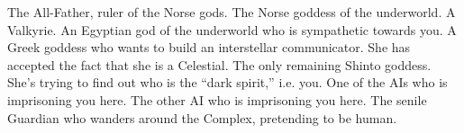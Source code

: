\documentclass[char]{guardians}
\begin{document}
\begin{contacts}
  \contact{\cOdin{}} The All-Father, ruler of the Norse gods.
  \contact{\cHel{}} The Norse goddess of the underworld.
  \contact{\cVal{}} A Valkyrie.
  \contact{\cAnubis{}} An Egyptian god of the underworld who is sympathetic towards you.
  \contact{\cAthena{}} A Greek goddess who wants to build an interstellar communicator. She has accepted the fact that she is a Celestial.
  \contact{\cAmaterasu{}} The only remaining Shinto goddess. She's trying to find out who is the ``dark spirit,'' i.e. you.
   One of the AIs who is imprisoning you here.
   The other AI who is imprisoning you here.
  \contact{\cJascha{}} The senile Guardian who wanders around the Complex, pretending to be human.
\end{contacts}
\end{document}

